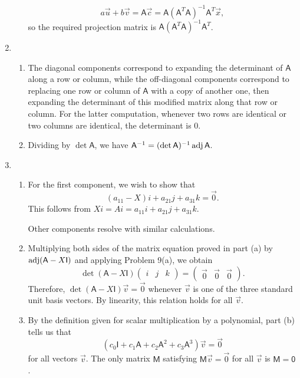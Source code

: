 \begin{enumerate}
\begin{enumerate}
\begin{equation*}
a\vec{u} + b\vec{v} = \mathsf{A}\vec{c} = \mathsf{A}(\mathsf{A}^T\mathsf{A})^{-1}\mathsf{A}^T\vec{x},
\end{equation*}
so the required projection matrix is $\mathsf{A}(\mathsf{A}^T\mathsf{A})^{-1}\mathsf{A}^T$.
\end{enumerate}
\item \begin{enumerate}
\item The diagonal components correspond to expanding the determinant of $\mathsf{A}$ along a row or column, while the off-diagonal components correspond to replacing one row or column of $\mathsf{A}$ with a copy of another one, then expanding the determinant of this modified matrix along that row or column. For the latter computation, whenever two rows are identical or two columns are identical, the determinant is 0.
\item Dividing by $\det\mathsf{A}$, we have $\mathsf{A}^{-1} = (\det\mathsf{A})^{-1}\operatorname{adj}\mathsf{A}$.
\end{enumerate}
\item \begin{enumerate}
\item For the first component, we wish to show that
\begin{equation*}
(a_{11} - X)\unit{i} + a_{21}\unit{j} + a_{31}\unit{k} = \vec{0}.
\end{equation*}
This follows from $X\unit{i} = A\unit{i} = a_{11}\unit{i} + a_{21}\unit{j} + a_{31}\unit{k}$.\par
Other components resolve with similar calculations.
\newpage
\item Multiplying both sides of the matrix equation proved in part (a) by $\operatorname{adj}(\mathsf{A} - X\mathsf{I})$ and applying Problem 9(a), we obtain
\begin{equation*}
\det(\mathsf{A} - X\mathsf{I})\begin{pmatrix} \unit{i} & \unit{j} & \unit{k} \end{pmatrix} = \begin{pmatrix} \vec{0} & \vec{0} & \vec{0} \end{pmatrix}.
\end{equation*}
Therefore, $\det(\mathsf{A} - X\mathsf{I})\vec{v} = \vec{0}$ whenever $\vec{v}$ is one of the three standard unit basis vectors. By linearity, this relation holds for all $\vec{v}$.
\item By the definition given for scalar multiplication by a polynomial, part (b) tells us that
\begin{equation*}
(c_0\mathsf{I} + c_1\mathsf{A} + c_2\mathsf{A}^2 + c_3\mathsf{A}^3)\vec{v} = \vec{0}
\end{equation*}
for all vectors $\vec{v}$. The only matrix $\mathsf{M}$ satisfying $\mathsf{M}\vec{v} = \vec{0}$ for all $\vec{v}$ is $\mathsf{M} = \mathsf{0}$.
\end{enumerate}
\end{enumerate}
